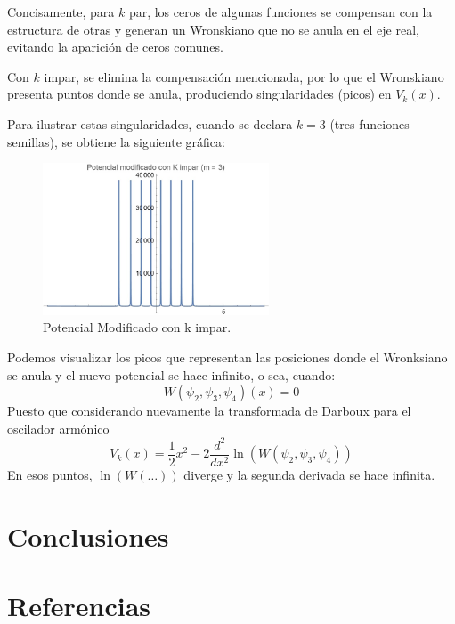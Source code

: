 \documentclass[%
 aip,
 jmp,%
 amsmath,amssymb,
 reprint,
]{revtex4-2}
\begin{document}
Concisamente, para \( k \) par, los ceros de algunas funciones se compensan con la estructura de otras y generan un Wronskiano que no se anula en el eje real, evitando la aparición de ceros comunes. 

Con \( k \) impar, se elimina la compensación mencionada, por lo que el Wronskiano presenta puntos donde se anula, produciendo singularidades (picos) en \( V_k(x) \). 

Para ilustrar estas singularidades, cuando se declara \( k = 3 \) (tres funciones semillas), se obtiene la siguiente gráfica:

\begin{figure}[H]
    \centering
    \includegraphics[width=0.6\textwidth]{QHO_Odd.jpeg}
    \caption{Potencial Modificado con k impar.}
    \label{fig:modified_oscillator}
\end{figure}
Podemos visualizar los picos que representan las posiciones donde el Wronksiano se anula y el nuevo potencial se hace infinito, o sea, cuando:
\begin{equation}
W(\psi_2, \psi_3, \psi_4)(x)=0
\end{equation}
Puesto que considerando nuevamente la transformada de Darboux para el oscilador armónico
\begin{equation}
V_k(x) = \frac{1}{2} x^2 - 2 \frac{d^2}{dx^2} \ln \left( W(\psi_2, \psi_3, \psi_4) \right)
\end{equation}
En esos puntos, \( \ln(W(\dots)) \) diverge y la segunda derivada se hace infinita.

\section{Conclusiones}

\nocite{*}
\maketitle
\section{Referencias}
\end{document}
